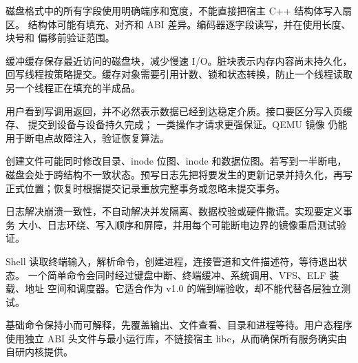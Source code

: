 磁盘格式中的所有字段使用明确端序和宽度，不能直接把宿主 C++ 结构体写入扇区。
结构体可能有填充、对齐和 ABI 差异。编码器逐字段读写，并在使用长度、块号和
偏移前验证范围。

缓冲缓存保存最近访问的磁盘块，减少慢速 I/O。脏块表示内存内容尚未持久化，
回写线程按策略提交。缓存对象需要引用计数、锁和状态转换，防止一个线程读取
另一个线程正在填充的半成品。

用户看到写调用返回，并不必然表示数据已经到达稳定介质。接口要区分写入页缓存、
提交到设备与设备持久完成； 一类操作才请求更强保证。QEMU 镜像
仍能用于断电点故障注入，验证恢复算法。

创建文件可能同时修改目录、inode 位图、inode 和数据位图。若写到一半断电，
磁盘会处于跨结构不一致状态。预写日志先把将要发生的更新记录并持久化，再写
正式位置；恢复时根据提交记录重放完整事务或忽略未提交事务。

日志解决崩溃一致性，不自动解决并发隔离、数据校验或硬件撒谎。实现要定义事务
大小、日志环绕、写入顺序和屏障，并用每个可能断电边界的镜像重启测试验证。

Shell 读取终端输入，解析命令，创建进程，连接管道和文件描述符，等待退出状态。
一个简单命令会同时经过键盘中断、终端缓冲、系统调用、VFS、ELF 装载、地址
空间和调度器。它适合作为 v1.0 的端到端验收，却不能代替各层独立测试。

基础命令保持小而可解释，先覆盖输出、文件查看、目录和进程等待。用户态程序
使用独立 ABI 头文件与最小运行库，不链接宿主 libc，从而确保所有服务确实由
自研内核提供。
